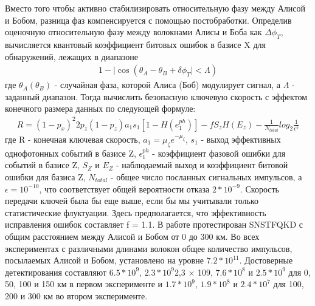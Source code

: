  Вместо того чтобы активно стабилизировать относительную фазу между Алисой и Бобом, разница фаз компенсируется с помощью постобработки. Определив оценочную относительную фазу между волокнами Алисы и Боба как $\Delta\phi_T$, вычисляется квантовый коэффициент битовых ошибок в базисе X для обнаружений, лежащих в диапазоне 
 \begin{align}
    1 - |\cos(\theta_A - \theta_B + \delta\phi_T| < \Lambda)
    \label{eq: QBER error TF}
\end{align}
 где $\theta_A (\theta_B)$ - случайная фаза, которой Алиса (Боб) модулирует сигнал, а $\Lambda$ - заданный диапазон. Тогда вычислить безопасную ключевую скорость с эффектом конечного размера данных по следующей формуле:
 \begin{align}
    R = (1 - p_x)^2{2p_z(1-p_z)a_1s_1[1 - H(e_1^{ph})] - fS_zH(E_z)} - \frac{1}{N_{total}}log_2\frac{1}{\epsilon^5}
    \label{eq: TF qkd rate lit}
\end{align}
 где R - конечная ключевая скорость, $a_1 = \mu_{\zeta}e^{-\mu_{\zeta}}$, $s_1$ - выход эффективных однофотонных событий в базисе Z, $\epsilon_1^{ph}$ - коэффициент фазовой ошибки для событий в базисе Z, $S_Z$ и $E_Z$ - наблюдаемый выход и коэффициент битовой ошибки для базиса Z, $N_{total}$ - общее число посланных сигнальных импульсов, а $\epsilon =10^{-10}$, что соответствует общей вероятности отказа $2*10^{-9}$. Скорость передачи ключей была бы еще выше, если бы мы учитывали только статистические флуктуации. Здесь предполагается, что эффективность исправления ошибок составляет f = 1.1. В работе протестирован SNSTFQKD с общим расстоянием между Алисой и Бобом от 0 до 300 км.  Во всех экспериментах с различными длинами волокон общее количество импульсов, посылаемых Алисой и Бобом, установлено на уровне $7.2*10^{11}$. Достоверные детектирования составляют $6.5*10^{9}$, $2.3*10^{9}$2,3 × 109, $7.6*10^{8}$ и $2.5*10^{9}$ для 0, 50, 100 и 150 км в первом эксперименте и $1.7*10^{9}$, $1.9*10^{8}$  и  $2.4*10^{7}$ для 100, 200 и 300 км во втором эксперименте. 
